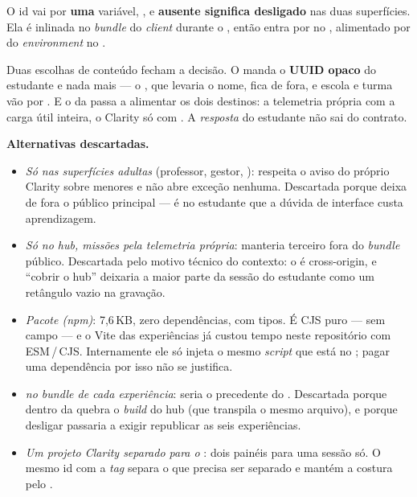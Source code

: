O id vai por \textbf{uma} variável, , e
\textbf{ausente significa desligado} nas duas superfícies. Ela é inlinada no
\emph{bundle} do \emph{client} durante o , então entra por
 no , alimentado por
 do \emph{environment} no .

Duas escolhas de conteúdo fecham a decisão. O  manda o
\textbf{UUID opaco} do estudante e nada mais --- o , que
levaria o nome, fica de fora, e escola e turma vão por . E o
 da  passa a alimentar os dois destinos: a telemetria
própria com a carga útil inteira, o Clarity só com . A
\emph{resposta} do estudante não sai do contrato.

\textbf{Alternativas descartadas.}
\begin{itemize}
  \item \emph{Só nas superfícies adultas} (professor, gestor,
    ): respeita o aviso do próprio Clarity sobre menores e
    não abre exceção nenhuma. Descartada porque deixa de fora o público
    principal --- é no estudante que a dúvida de interface custa aprendizagem.
  \item \emph{Só no hub, missões pela telemetria própria}: manteria terceiro
    fora do \emph{bundle} público. Descartada pelo motivo técnico do contexto:
    o  é cross-origin, e \enquote{cobrir o hub} deixaria a maior
    parte da sessão do estudante como um retângulo vazio na gravação.
  \item \emph{Pacote  (npm)}: 7,6\,KB, zero
    dependências, com tipos. É CJS puro --- sem campo  --- e o Vite
    das experiências já custou tempo neste repositório com ESM\,/\,CJS.
    Internamente ele só injeta o mesmo \emph{script} que está no
    ; pagar uma dependência por isso não se justifica.
  \item \emph{ no \emph{bundle} de cada
    experiência}: seria o precedente do .
    Descartada porque  dentro da  quebra o
    \emph{build} do hub (que transpila o mesmo arquivo), e porque desligar
    passaria a exigir republicar as seis experiências.
  \item \emph{Um projeto Clarity separado para o }: dois painéis
    para uma sessão só. O mesmo id com a \emph{tag}  separa o
    que precisa ser separado e mantém a costura pelo .
\end{itemize}

